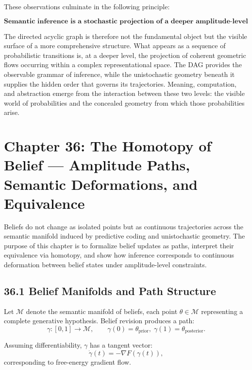 \documentclass[12pt,letterpaper]{article}
\theoremstyle{remark}
\begin{document}
These observations culminate in the following principle:

\[
\boxed{
\textbf{Semantic inference is a stochastic projection of a deeper amplitude-level geometry.}
}
\]

The directed acyclic graph is therefore not the fundamental object but the visible surface of a more comprehensive structure. What appears as a sequence of probabilistic transitions is, at a deeper level, the projection of coherent geometric flows occurring within a complex representational space. The DAG provides the observable grammar of inference, while the unistochastic geometry beneath it supplies the hidden order that governs its trajectories. Meaning, computation, and abstraction emerge from the interaction between these two levels: the visible world of probabilities and the concealed geometry from which those probabilities arise.

\newpage

\section{Chapter 36: The Homotopy of Belief —  
Amplitude Paths, Semantic Deformations, and Equivalence}

Beliefs do not change as isolated points but as continuous trajectories across the semantic manifold induced by predictive coding and unistochastic geometry. The purpose of this chapter is to formalize belief updates as paths, interpret their equivalence via homotopy, and show how inference corresponds to continuous deformation between belief states under amplitude-level constraints.

\subsection{36.1 Belief Manifolds and Path Structure}

Let $\mathcal{M}$ denote the semantic manifold of beliefs, each point $\theta \in \mathcal{M}$ representing a complete generative hypothesis. Belief revision produces a path:
\[
\gamma : [0,1] \to \mathcal{M}, \qquad \gamma(0)=\theta_{\text{prior}}, \; \gamma(1)=\theta_{\text{posterior}}.
\]

Assuming differentiability, $\gamma$ has a tangent vector:
\[
\dot{\gamma}(t) = -\nabla F(\gamma(t)),
\]
corresponding to free-energy gradient flow.
\end{document}
